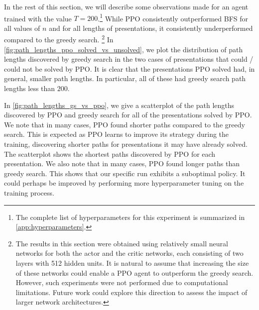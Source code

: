 In the rest of this section, we will describe some observations made for an agent trained with the value $T=200$.\footnote{The complete list of hyperparameters for this experiment is summarized in \cref{app:hyperparameters}.}
While PPO consistently outperformed BFS for all values of $n$ and for all lengths of presentations, it consistently underperformed compared to the greedy search.
\footnote{The results in this section were obtained using relatively small neural networks for both the actor and the critic networks, each consisting of two layers with 512 hidden units. It is natural to assume that increasing the size of these networks could enable a PPO agent to outperform the greedy search. However, such experiments were not performed due to computational limitations. Future work could explore this direction to assess the impact of larger network architectures.}
In \cref{fig:path_lengths_ppo_solved_vs_unsolved}, we plot the distribution of path lengths discovered by greedy search in the two cases of presentations that could / could not be solved by PPO. It is clear that the presentations PPO solved had, in general, smaller path lengths. In particular, all of these had greedy search path lengths less than $200$.

In \cref{fig:path_lengths_gs_vs_ppo}, we give a scatterplot of the path lengths discovered by PPO and greedy search for all of the presentations solved by PPO. We note that in many cases, PPO found shorter paths compared to the greedy search. This is expected as PPO learns to improve its strategy during the training, discovering shorter paths for presentations it may have already solved. The scatterplot shows the shortest paths discovered by PPO for each presentation. We also note that in many cases, PPO found longer paths than greedy search. This shows that our specific run exhibits a suboptimal policy. It could perhaps be improved by performing more hyperparameter tuning on the training process.

